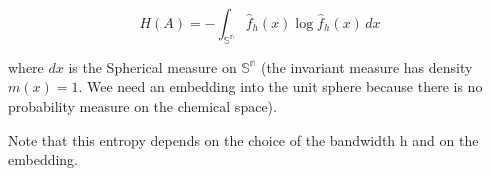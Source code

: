 \[ H(A) = -\int_\mathbb{{S}^n}  \hat{f}_h(x)\log  \hat{f}_h(x) \,dx  \]



where $dx$ is the Spherical measure on $\mathbb{{S}^n}$ (the invariant measure has density $m(x)=1$. Wee need an embedding into the unit sphere because there is no probability measure on the chemical space).

Note that this entropy depends on the choice of the bandwidth h and on the embedding.
